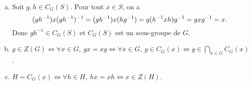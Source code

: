 \begin{enumerate}[a)]
  \item Soit $g,h\in C_G(S)$. Pour tout $x\in S$, on a
    \[
      (gh^{-1})x(gh^{-1})^{-1} = (gh^{-1})x(hg^{-1})
      = g(h^{-1}xh)g^{-1}
      = gxg^{-1} \\
      = x.
    \]
    Donc $gh^{-1}\in C_G(S)$ et $C_G(S)$ est un sous-groupe de $G$.

  \item $g\in Z(G) \Leftrightarrow \forall x\in G,\: gx=xg
    \Leftrightarrow \forall x\in G,\: g\in C_G(x)
    \Leftrightarrow g\in\bigcap_{x\in G} C_G(x)$.

  \item $H = C_G(x) \Leftrightarrow \forall h\in H,\: hx=xh
    \Leftrightarrow x\in Z(H)$.
\end{enumerate}

